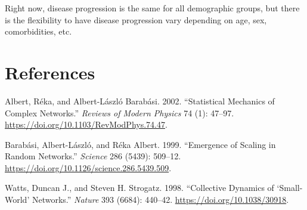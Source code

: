 \documentclass[
]{article}
\begin{document}
Right now, disease progression is the same for all demographic groups,
but there is the flexibility to have disease progression vary depending
on age, sex, comorbidities, etc.

\hypertarget{references}{%
\section{References}\label{references}}

\hypertarget{refs}{}
\leavevmode\hypertarget{ref-albert:statistical.mechanics:2002}{}%
Albert, Réka, and Albert-László Barabási. 2002. ``Statistical Mechanics
of Complex Networks.'' \emph{Reviews of Modern Physics} 74 (1): 47--97.
\url{https://doi.org/10.1103/RevModPhys.74.47}.

\leavevmode\hypertarget{ref-barabasi:emergence.scaling:1999}{}%
Barabási, Albert-László, and Réka Albert. 1999. ``Emergence of Scaling
in Random Networks.'' \emph{Science} 286 (5439): 509--12.
\url{https://doi.org/10.1126/science.286.5439.509}.

\leavevmode\hypertarget{ref-watts:collective.dynamics:1998}{}%
Watts, Duncan J., and Steven H. Strogatz. 1998. ``Collective Dynamics of
`Small-World' Networks.'' \emph{Nature} 393 (6684): 440--42.
\url{https://doi.org/10.1038/30918}.
\end{document}

